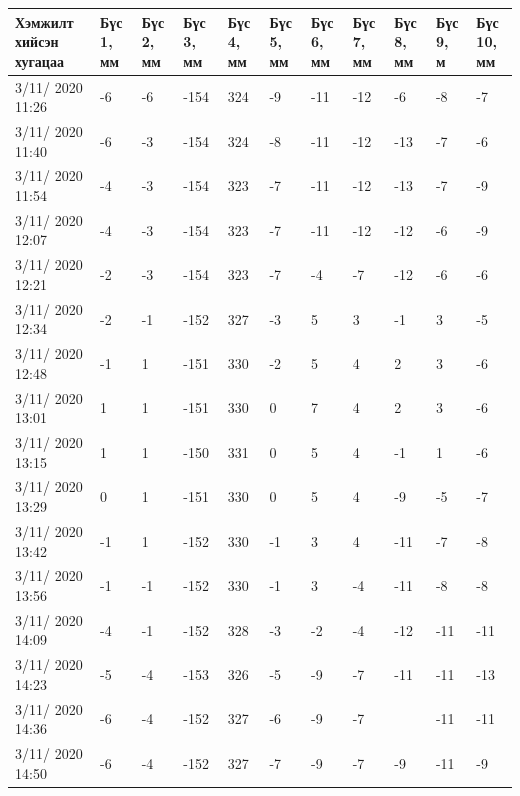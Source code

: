 \begin{table}[h]
    \centering
    \begin{tabular}{|p{1.5cm}|p{0.8cm}|p{0.8cm}|p{0.8cm}|p{0.8cm}|p{0.8cm}|p{0.8cm}|p{0.8cm}|p{0.8cm}|p{0.8cm}|p{0.8cm}|}
         \hline
     Хэмжилт хийсэн хугацаа & Бүс 1, мм&	Бүс 2, мм&	Бүс 3, мм&	Бүс 4, мм&	Бүс 5, мм&	Бүс 6, мм&	Бүс 7, мм&	Бүс 8, мм&	Бүс 9, м&	Бүс 10, мм \\ \hline
3/11/ 2020 11:26&	-6&	-6&	-154&	324&-9&	-11&-12&-6&	-8&	-7 \\ \hline
3/11/ 2020 11:40&	-6&	-3&	-154&	324&-8&	-11&-12&-13&-7&	-6 \\ \hline
3/11/ 2020 11:54&	-4&	-3&	-154&	323&-7&	-11&-12&-13&-7&	-9 \\ \hline
3/11/ 2020 12:07&	-4&	-3&	-154&	323&-7&	-11&-12&-12&-6&	-9 \\ \hline
3/11/ 2020 12:21&	-2&	-3&	-154&	323&-7&	-4&	-7&	-12&-6&	-6 \\ \hline
3/11/ 2020 12:34&	-2&	-1&	-152&	327&-3&	5&	3&	-1&	3&	-5 \\ \hline
3/11/ 2020 12:48&	-1&	1&	-151&	330&-2&	5&	4&	2&	3&	-6 \\ \hline
3/11/ 2020 13:01&	1&	1&	-151&	330&0&	7&	4&	2&	3&	-6 \\ \hline
3/11/ 2020 13:15&	1&	1&	-150&	331&0&	5&	4&	-1&	1&	-6 \\ \hline
3/11/ 2020 13:29&	0&	1&	-151&	330&0&	5&	4&	-9&	-5&	-7 \\ \hline
3/11/ 2020 13:42&	-1&	1&	-152&	330&-1&	3&	4&	-11&-7&	-8 \\ \hline
3/11/ 2020 13:56&	-1&	-1&	-152&	330&-1&	3&	-4&	-11&-8&	-8 \\ \hline
3/11/ 2020 14:09&	-4&	-1&	-152&	328&-3&	-2&	-4&	-12&-11&	-11 \\ \hline
3/11/ 2020 14:23&	-5&	-4&	-153&	326&-5&	-9&	-7&	-11&-11&	-13 \\ \hline
3/11/ 2020 14:36&	-6&	-4&	-152&	327&-6&	-9&	-7&	    &-11&   -11 \\ \hline
3/11/ 2020 14:50&	-6&	-4&	-152&	327&-7&	-9&	-7&	-9&	-11&	-9 \\ \hline
    \end{tabular}
\end{table}
